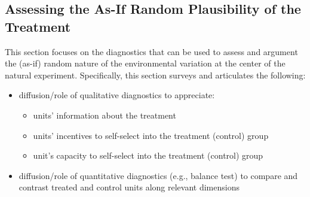 \documentclass[nobib]{tufte-handout}
\begin{document}
\begin{refsection}
\section{Assessing the As-If Random Plausibility of the Treatment}

\noindent This section focuses on the diagnostics that can be used to assess and
argument the (as-if) random nature of the environmental variation at the center
of the natural experiment. Specifically, this section surveys and articulates the
following:

\begin{itemize}
    \item diffusion/role of qualitative diagnostics to appreciate:
        \begin{itemize}
            \item units' information about the treatment
            \item units' incentives to self-select into the treatment (control)
                group
            \item unit's capacity to self-select into the treatment (control)
                group
        \end{itemize}
    \item diffusion/role of quantitative diagnostics (e.g., balance test) to 
        compare and contrast treated and control units along relevant dimensions
\end{itemize}

%
%
%
%
%
%
%
%
%
%
%
%
%


\end{refsection}
\end{document}
